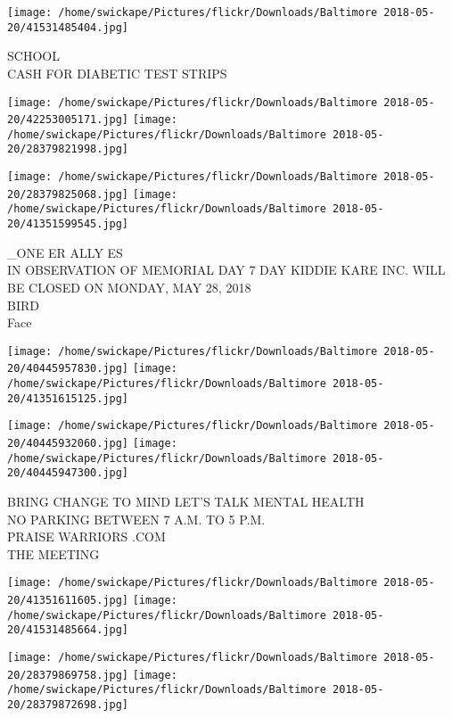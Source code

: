 \documentclass[10pt,letterpaper]{article}
\begin{document}
\vspace{0.25in}
\texttt{[image: /home/swickape/Pictures/flickr/Downloads/Baltimore 2018-05-20/41531485404.jpg]}

SCHOOL\\
CASH FOR DIABETIC TEST STRIPS\\
\pagebreak

\texttt{[image: /home/swickape/Pictures/flickr/Downloads/Baltimore 2018-05-20/42253005171.jpg]}
\texttt{[image: /home/swickape/Pictures/flickr/Downloads/Baltimore 2018-05-20/28379821998.jpg]}

\texttt{[image: /home/swickape/Pictures/flickr/Downloads/Baltimore 2018-05-20/28379825068.jpg]}
\texttt{[image: /home/swickape/Pictures/flickr/Downloads/Baltimore 2018-05-20/41351599545.jpg]}

\_ONE ER ALLY ES\\
IN OBSERVATION OF MEMORIAL DAY 7 DAY KIDDIE KARE INC. WILL BE CLOSED ON MONDAY, MAY 28, 2018\\
BIRD\\
Face\\
\pagebreak

\texttt{[image: /home/swickape/Pictures/flickr/Downloads/Baltimore 2018-05-20/40445957830.jpg]}
\texttt{[image: /home/swickape/Pictures/flickr/Downloads/Baltimore 2018-05-20/41351615125.jpg]}

\texttt{[image: /home/swickape/Pictures/flickr/Downloads/Baltimore 2018-05-20/40445932060.jpg]}
\texttt{[image: /home/swickape/Pictures/flickr/Downloads/Baltimore 2018-05-20/40445947300.jpg]}

BRING CHANGE TO MIND LET'S TALK MENTAL HEALTH\\
NO PARKING BETWEEN 7 A.M. TO 5 P.M.\\
PRAISE WARRIORS .COM\\
THE MEETING\\
\pagebreak

\texttt{[image: /home/swickape/Pictures/flickr/Downloads/Baltimore 2018-05-20/41351611605.jpg]}
\texttt{[image: /home/swickape/Pictures/flickr/Downloads/Baltimore 2018-05-20/41531485664.jpg]}

\texttt{[image: /home/swickape/Pictures/flickr/Downloads/Baltimore 2018-05-20/28379869758.jpg]}
\texttt{[image: /home/swickape/Pictures/flickr/Downloads/Baltimore 2018-05-20/28379872698.jpg]}
\end{document}
